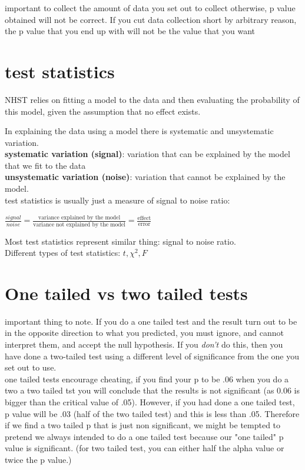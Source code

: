 important to collect the amount of data you set out to collect otherwise, p value obtained will not be correct. If you cut data collection short by arbitrary reason, the p value that you end up with will not be the value that you want

\section{test statistics}
NHST relies on fitting a model to the data and then evaluating the probability of this model, given the assumption that no effect exists.

In explaining the data using a model there is systematic and unsystematic variation.\\
\textbf{systematic variation (signal)}: variation that can be explained by the model that we fit to the data\\
\textbf{unsystematic variation (noise)}: variation that cannot be explained by the model.\\

test statistics is usually just a measure of signal to noise ratio:
\begin{center}
 $\frac{signal}{noise} = \frac{\text{variance explained by the model}}{\text{variance not explained by the model}} = \frac{\text{effect}}{\text{error}}$
\end{center}
Most test statistics represent similar thing: signal to noise ratio.\\
Different types of test statistics: $t, \chi^2, F $

\section{One tailed vs two tailed tests}
important thing to note. If you do a one tailed test and the result turn out to be in the opposite direction to what you predicted, you must ignore, and cannot interpret them, and accept the null hypothesis. If you \emph{don't} do this, then you have done a two-tailed test using a different level of significance from the one you set out to use. \\

one tailed tests encourage cheating, if you find your p to be .06 when you do a two a two tailed tst you will conclude that the results is not significant (as 0.06 is bigger than the critical value of .05). 
However, if you had done a one tailed test, p value will be .03 (half of the two tailed test) and this is less than .05. Therefore if we find a two tailed p that is just non significant, we might be tempted to pretend we always intended to do a one tailed test because our "one tailed" p value is significant. 
(for two tailed test, you can either half the alpha value or twice the p value.)
